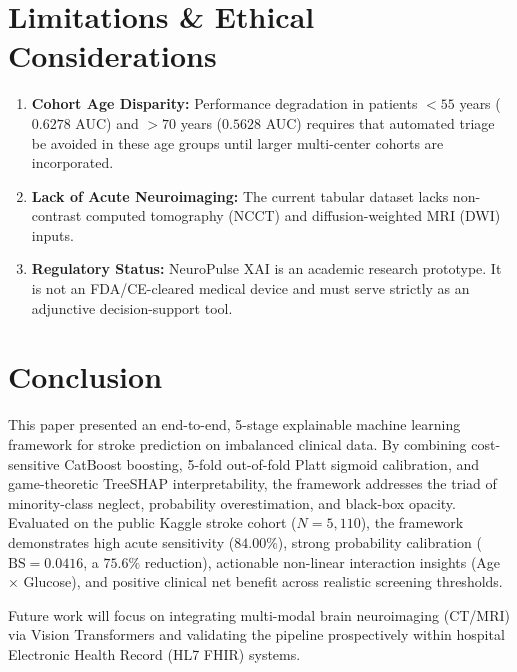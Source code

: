 \documentclass[conference]{IEEEtran}
\begin{document}
\section{Limitations \& Ethical Considerations}
\begin{enumerate}
    \item \textbf{Cohort Age Disparity:} Performance degradation in patients $<55$ years ($0.6278$ AUC) and $>70$ years ($0.5628$ AUC) requires that automated triage be avoided in these age groups until larger multi-center cohorts are incorporated.
    \item \textbf{Lack of Acute Neuroimaging:} The current tabular dataset lacks non-contrast computed tomography (NCCT) and diffusion-weighted MRI (DWI) inputs.
    \item \textbf{Regulatory Status:} NeuroPulse XAI is an academic research prototype. It is not an FDA/CE-cleared medical device and must serve strictly as an adjunctive decision-support tool.
\end{enumerate}

\section{Conclusion}
This paper presented an end-to-end, 5-stage explainable machine learning framework for stroke prediction on imbalanced clinical data. By combining cost-sensitive CatBoost boosting, 5-fold out-of-fold Platt sigmoid calibration, and game-theoretic TreeSHAP interpretability, the framework addresses the triad of minority-class neglect, probability overestimation, and black-box opacity. Evaluated on the public Kaggle stroke cohort ($N = 5,110$), the framework demonstrates high acute sensitivity ($84.00\%$), strong probability calibration ($\text{BS} = 0.0416$, a $75.6\%$ reduction), actionable non-linear interaction insights (Age $\times$ Glucose), and positive clinical net benefit across realistic screening thresholds.

Future work will focus on integrating multi-modal brain neuroimaging (CT/MRI) via Vision Transformers and validating the pipeline prospectively within hospital Electronic Health Record (HL7 FHIR) systems.
\end{document}
